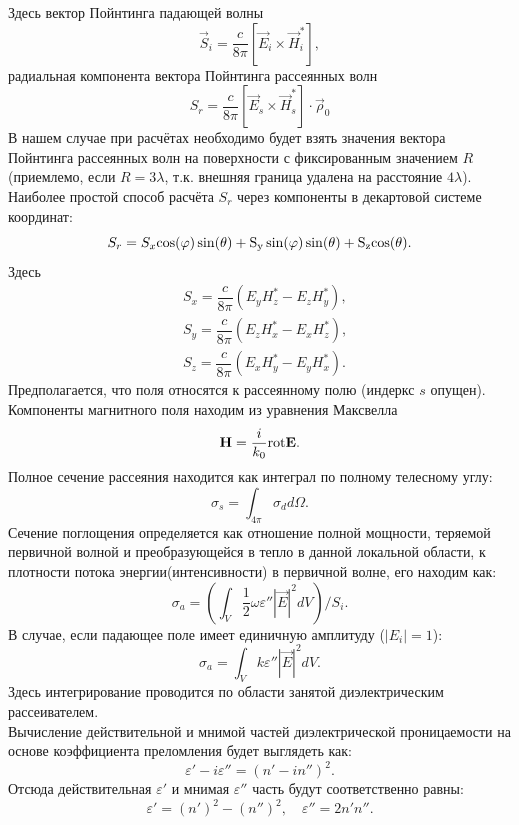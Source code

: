 Здесь вектор Пойнтинга падающей волны
\begin{equation}
{\vec S}_i = \dfrac{c}{8\pi} \left[{\vec E}_i \times {\vec H}^*_i\right],
\end{equation}
радиальная компонента вектора Пойнтинга рассеянных волн
\begin{equation}
{S}_r = \dfrac{c}{8\pi} \left[{\vec E}_s \times {\vec H}^*_s\right] \cdot {\vec \rho}_0
\end{equation}
В нашем случае при расчётах необходимо будет взять значения вектора Пойнтинга рассеянных волн на поверхности с фиксированным значением $R$ (приемлемо, если $R=3\lambda$, т.к. внешняя граница удалена на расстояние $4\lambda$).\\
Наиболее простой способ расчёта $S_r$ через компоненты в декартовой системе координат:
\begin{equation}
{S}_r = S_x \rm cos(\varphi)\sin(\theta) + S_y \sin(\varphi)\sin(\theta) + S_z \rm cos(\theta).
\end{equation}
Здесь
\begin{eqnarray}
& S_x = \dfrac{c}{8\pi} \left(E_y H_z^* - E_z H_y^*\right),\nonumber\\
& S_y = \dfrac{c}{8\pi} \left(E_z H_x^* - E_x H_z^*\right),\nonumber\\ & S_z = \dfrac{c}{8\pi} \left(E_x H_y^* - E_y H_x^*\right).
\end{eqnarray}
Предполагается, что поля относятся к рассеянному полю (индеркс $s$ опущен).
Компоненты магнитного поля находим из уравнения Максвелла
\begin{equation}
{\vec H} = \dfrac{i}{k_0} {\rm \rm rot} \vec{E}.
\end{equation}
Полное сечение рассеяния находится как интеграл по полному телесному углу:
\begin{equation}
\sigma_s = \int_{4\pi} \sigma_d d\Omega.
\end{equation}
Сечение поглощения определяется как отношение полной мощности, теряемой первичной волной и преобразующейся в тепло в данной локальной области, к плотности потока энергии(интенсивности) в первичной волне, его находим как:
\begin{equation}
\sigma_a = \left(\int_V \dfrac{1}{2}\omega\varepsilon''|{\vec E}|^2 d V\right)/S_i.
\end{equation}
В случае, если падающее поле имеет единичную амплитуду ($|E_i|=1$):
\begin{equation}
\sigma_a = \int_V k \varepsilon''|{\vec E}|^2 d V.
\end{equation}
Здесь интегрирование проводится по области занятой диэлектрическим рассеивателем.\\
Вычисление действительной и мнимой частей диэлектрической проницаемости на основе коэффициента преломления будет выглядеть как:
\begin{equation}
\varepsilon' - i \varepsilon'' = (n'-i n'')^2.
\end{equation}
Отсюда действительная $ \varepsilon' $ и мнимая $ \varepsilon'' $ часть будут соответственно равны:
\begin{equation}
\varepsilon' = (n')^2 - (n'')^2,\quad \varepsilon'' = 2 n'n''.
\end{equation}

